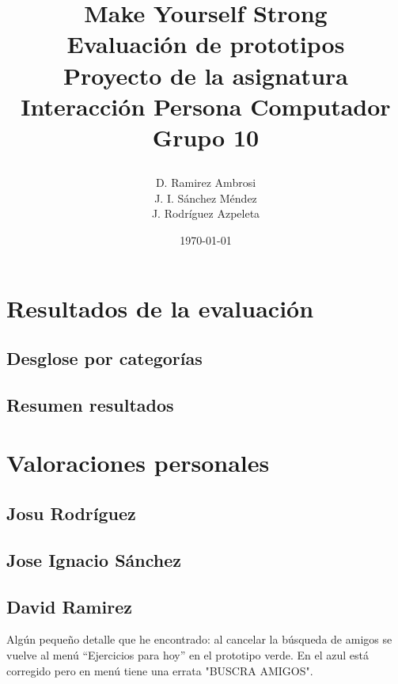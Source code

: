 \documentclass[a4paper]{article}
\date{}
\author{D. Ramirez Ambrosi \\ J. I. Sánchez Méndez \\ J. Rodríguez Azpeleta}
\title{\begin{center}
\textbf{\Huge{Make Yourself Strong}} \\ Evaluación de prototipos  \\Proyecto de la asignatura Interacción Persona Computador \\ \Huge{Grupo 10}
\end{center}}
\date{\today}
\renewcommand\listfigurename{\centering LISTA DE FIGURAS}
\begin{document}
\maketitle

\thispagestyle{empty}%
\newpage
\tableofcontents%
\thispagestyle{empty}
\newpage





\setcounter{page}{1}%


\section{Resultados de la evaluación}

\subsection{Desglose por categorías}

\subsection{Resumen resultados}

\section{Valoraciones personales}

\subsection{Josu Rodríguez}

\subsection{Jose Ignacio Sánchez}

\subsection{David Ramirez}

Algún pequeño detalle que he encontrado: al cancelar la búsqueda de amigos se vuelve al menú ``Ejercicios para hoy'' en el prototipo verde. En el azul está corregido pero en menú tiene una errata "BUSCRA AMIGOS".
\end{document}
